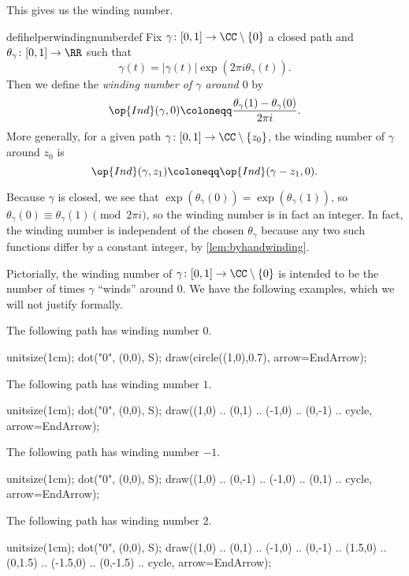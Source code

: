 \documentclass[../notes.tex]{subfiles}
\begin{document}
This gives us the winding number.
\begin{restatable}{defihelper}{windingnumberdef} 
	Fix $\gamma\colon [0,1]\to\CC\setminus\{0\}$ a closed path and $\theta_\gamma\colon [0,1]\to\RR$ such that
	\[\gamma(t)=|\gamma(t)|\exp(2\pi i\theta_\gamma(t)).\]
	Then we define the \textit{winding number of $\gamma$ around $0$} by
	\[\op{Ind}(\gamma,0)\coloneqq \frac{\theta_\gamma(1)-\theta_\gamma(0)}{2\pi i}.\]
	More generally, for a given path $\gamma\colon [0,1]\to\CC\setminus\{z_0\}$, the winding number of $\gamma$ around $z_0$ is
	\[\op{Ind}(\gamma,z_1)\coloneqq \op{Ind}(\gamma-z_1,0).\]
\end{restatable}
\begin{remark}
	Because $\gamma$ is closed, we see that $\exp(\theta_\gamma(0))=\exp(\theta_\gamma(1))$, so $\theta_\gamma(0)\equiv\theta_\gamma(1)\pmod{2\pi i}$, so the winding number is in fact an integer. In fact, the winding number is independent of the chosen $\theta_\gamma$ because any two such functions differ by a constant integer, by \autoref{lem:byhandwinding}.
\end{remark}
Pictorially, the winding number of $\gamma\colon [0,1]\to\CC\setminus\{0\}$ is intended to be the number of times $\gamma$ ``winds'' around $0$. We have the following examples, which we will not justify formally.
\begin{example}
	The following path has winding number $0$.
	\begin{center}
		\begin{asy}
			unitsize(1cm);
			dot("$0$", (0,0), S);
			draw(circle((1,0),0.7), arrow=EndArrow);
		\end{asy}
	\end{center}
\end{example}
\begin{example}
	The following path has winding number $1$.
	\begin{center}
		\begin{asy}
			unitsize(1cm);
			dot("$0$", (0,0), S);
			draw((1,0) .. (0,1) .. (-1,0) .. (0,-1) .. cycle, arrow=EndArrow);
		\end{asy}
	\end{center}
\end{example}
\begin{example}
	The following path has winding number $-1$.
	\begin{center}
		\begin{asy}
			unitsize(1cm);
			dot("$0$", (0,0), S);
			draw((1,0) .. (0,-1) .. (-1,0) .. (0,1) .. cycle, arrow=EndArrow);
		\end{asy}
	\end{center}
\end{example}
\begin{example}
	The following path has winding number $2$.
	\begin{center}
		\begin{asy}
			unitsize(1cm);
			dot("$0$", (0,0), S);
			draw((1,0) .. (0,1) .. (-1,0) .. (0,-1) .. (1.5,0) .. (0,1.5) .. (-1.5,0) .. (0,-1.5) .. cycle, arrow=EndArrow);
		\end{asy}
	\end{center}
\end{example}
\end{document}

